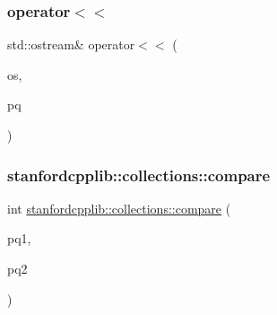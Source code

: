 \subsubsection{\texorpdfstring{operator$<$$<$}{operator<<}}
{\footnotesize\ttfamily std\+::ostream\& operator$<$$<$ (\begin{DoxyParamCaption}\item[{std\+::ostream \&}]{os,  }\item[{const \mbox{\hyperlink{classPriorityQueue}{Priority\+Queue}}$<$ T $>$ \&}]{pq }\end{DoxyParamCaption})\hspace{0.3cm}{\ttfamily [friend]}}

\mbox{\label{classPriorityQueue_ac12ad2761ec7037f8866b726424a81e2}} 
\subsubsection{\texorpdfstring{stanfordcpplib\+::collections\+::compare}{stanfordcpplib::collections::compare}}
{\footnotesize\ttfamily int \mbox{\hyperlink{namespacestanfordcpplib_1_1collections_a6d113dfaa3d28a3894990c64411ff03c}{stanfordcpplib\+::collections\+::compare}} (\begin{DoxyParamCaption}\item[{const Collection \&}]{pq1,  }\item[{const Collection \&}]{pq2 }\end{DoxyParamCaption})\hspace{0.3cm}{\ttfamily [friend]}}

